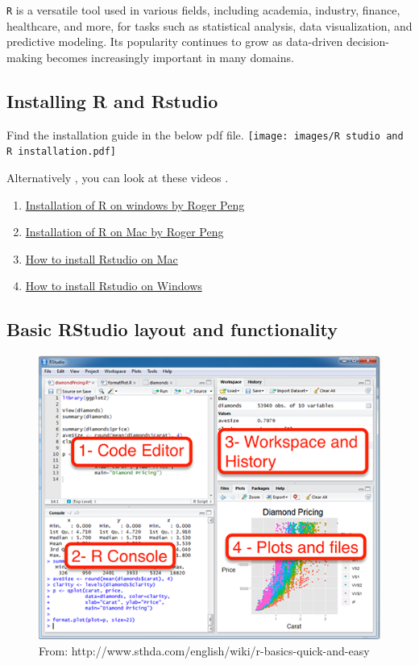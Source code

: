 \documentclass[
]{book}
\providecommand{\tightlist}{%
  \setlength{\itemsep}{0pt}\setlength{\parskip}{0pt}}
\begin{document}
\texttt{R} is a versatile tool used in various fields, including academia, industry, finance, healthcare, and more, for tasks such as statistical analysis, data visualization, and predictive modeling. Its popularity continues to grow as data-driven decision-making becomes increasingly important in many domains.

\subsection*{Installing R and Rstudio}\label{installing-r-and-rstudio}

Find the installation guide in the below pdf file.
\texttt{[image: images/R studio and R installation.pdf]}

Alternatively , you can look at these videos .

\begin{enumerate}
\def\labelenumi{\arabic{enumi}.}
\tightlist
\item
  \href{https://www.youtube.com/watch?v=Ohnk9hcxf9M}{Installation of R on windows by Roger Peng}
\item
  \href{https://www.youtube.com/watch?v=uxuuWXU-7UQ&feature=youtu.be&themeRefresh=1&theme=dark}{Installation of R on Mac by Roger Peng}
\item
  \href{https://www.youtube.com/watch?v=n8kP7c_QbLA}{How to install Rstudio on Mac}
\item
  \href{https://www.youtube.com/watch?v=YrEe2TLr3MI}{How to install Rstudio on Windows}
\end{enumerate}

\subsection*{Basic RStudio layout and functionality}\label{basic-rstudio-layout-and-functionality}

\begin{figure}
\includegraphics[width=0.8\linewidth]{images/rstudio_layout} \caption{From: http://www.sthda.com/english/wiki/r-basics-quick-and-easy }\label{fig:unnamed-chunk-3}
\end{figure}
\end{document}
